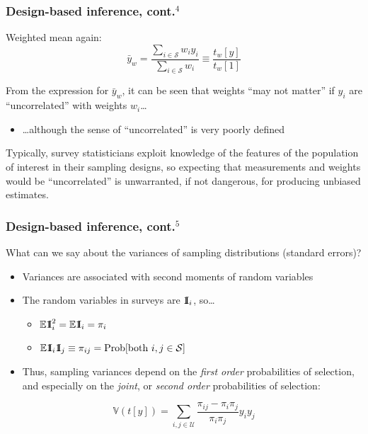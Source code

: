 \documentclass{beamer}
\newcommand{\Expect}{\mathbb{E}}
\newcommand{\Var}{\mathbb{V}}
\newcommand{\One}{{\rm 1\kern-0.3em I}}
\begin{document}
\begin{frame}\frametitle{Design-based inference, cont.$^4$}

Weighted mean again:
$$ \bar y_w = \frac{\sum_{i\in\mathcal{S}} w_i y_i}{\sum_{i\in\mathcal{S}} w_i} \equiv \frac{t_w[y]}{t_w[1]} $$

\bigskip

From the expression for $\bar y_w$, it can be seen that weights ``may not matter'' 
if $y_i$ are ``uncorrelated'' with weights $w_i$\ldots
\begin{itemize}
    \item \ldots although the sense of ``uncorrelated'' is very poorly defined
\end{itemize}
Typically, survey statisticians exploit knowledge of the features of the population of interest
in their sampling designs, so expecting that measurements and weights would be ``uncorrelated'' is
unwarranted, if not dangerous, for producing unbiased estimates.

\end{frame}

\begin{frame}\frametitle{Design-based inference, cont.$^5$}

What can we say about the variances of sampling distributions (standard errors)?

\begin{itemize}
    \item Variances are associated with second moments of random variables
    \item The random variables in surveys are $\One_i$, so\ldots
        \begin{itemize}
            \item $\Expect \One_i^2 = \Expect \One_i = \pi_i$
            \item $\Expect \One_i \One_j \equiv \pi_{ij} = {\rm Prob}[\mbox{both }i,j \in \mathcal{S}]$
        \end{itemize}
    \item Thus, sampling variances depend on the \textit{first order}
        probabilities of selection, and especially on the
        \textit{joint}, or \textit{second order} probabilities of selection:
\end{itemize}

$$
\Var( t[y] ) = \sum_{i, j\in\mathcal{U}} \frac{\pi_{ij}-\pi_i \pi_j}{\pi_i \pi_j} y_i y_j
$$

\end{frame}
\end{document}
